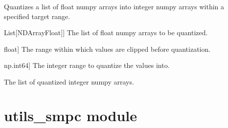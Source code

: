\documentclass[letterpaper,10pt,english]{sphinxmanual}
\begin{document}
\begin{fulllineitems}
\label{\detokenize{utils_quantisation:utils_quantisation.quantize}}
\pysigstartsignatures
{}
\pysigstopsignatures
\sphinxAtStartPar
Quantizes a list of float numpy arrays into integer numpy arrays within a specified target range.
\begin{description}
\begin{description}
\sphinxlineitem{parameters}{[}List{[}NDArrayFloat{]}{]}
\sphinxAtStartPar
The list of float numpy arrays to be quantized.

\sphinxlineitem{clipping\_range}{[}float{]}
\sphinxAtStartPar
The range within which values are clipped before quantization.

\sphinxlineitem{target\_range}{[}np.int64{]}
\sphinxAtStartPar
The integer range to quantize the values into.

\end{description}

\begin{description}
\sphinxAtStartPar
The list of quantized integer numpy arrays.

\end{description}

\end{description}

\end{fulllineitems}


\sphinxstepscope


\section{utils\_smpc module}
\label{\detokenize{utils_smpc:module-utils_smpc}}\label{\detokenize{utils_smpc:utils-smpc-module}}\label{\detokenize{utils_smpc::doc}}
\end{document}
